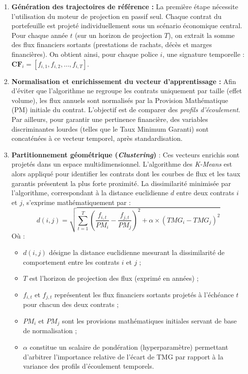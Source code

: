 \begin{enumerate}
    \item \textbf{Génération des trajectoires de référence :} 
    La première étape nécessite l'utilisation du moteur de projection en passif seul. Chaque contrat du portefeuille est projeté individuellement sous un scénario économique central. Pour chaque année $t$ (sur un horizon de projection $T$), on extrait la somme des flux financiers sortants (prestations de rachats, décès et marges financières). On obtient ainsi, pour chaque police $i$, une signature temporelle : $\mathbf{CF}_i = [f_{i,1}, f_{i,2}, \dots, f_{i,T}]$.
    
    \item \textbf{Normalisation et enrichissement du vecteur d'apprentissage :} 
    Afin d'éviter que l'algorithme ne regroupe les contrats uniquement par taille (effet volume), les flux annuels sont normalisés par la Provision Mathématique (PM) initiale du contrat. L'objectif est de comparer des \textit{profils d'écoulement}. Par ailleurs, pour garantir une pertinence financière, des variables discriminantes lourdes (telles que le Taux Minimum Garanti) sont concaténées à ce vecteur temporel, après standardisation.
    
    \item \textbf{Partitionnement géométrique (\textit{Clustering})} : 
    Ces vecteurs enrichis sont projetés dans un espace multidimensionnel. L'algorithme des \textit{K-Means} est alors appliqué pour identifier les contrats dont les courbes de flux et les taux garantis présentent la plus forte proximité. La dissimilarité minimisée par l'algorithme, correspondant à la distance euclidienne $d$ entre deux contrats $i$ et $j$, s'exprime mathématiquement par :
    \begin{equation}
        d(i, j) = \sqrt{\sum_{t=1}^{T} \left( \frac{f_{i,t}}{PM_i} - \frac{f_{j,t}}{PM_j} \right)^2 + \alpha \times (TMG_i - TMG_j)^2}
    \end{equation}
    Où :
    \begin{itemize}
        \item $d(i, j)$ désigne la distance euclidienne mesurant la dissimilarité de comportement entre les contrats $i$ et $j$ ;
        \item $T$ est l'horizon de projection des flux (exprimé en années) ;
        \item $f_{i,t}$ et $f_{j,t}$ représentent les flux financiers sortants projetés à l'échéance $t$ pour chacun des deux contrats ;
        \item $PM_i$ et $PM_j$ sont les provisions mathématiques initiales servant de base de normalisation ;
        \item $\alpha$ constitue un scalaire de pondération (hyperparamètre) permettant d'arbitrer l'importance relative de l'écart de TMG par rapport à la variance des profils d'écoulement temporels.
    \end{itemize}
    

\end{enumerate}
